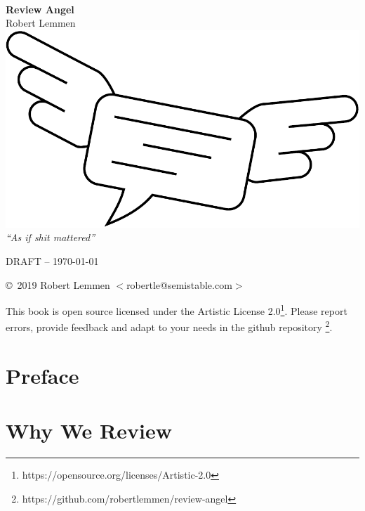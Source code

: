 \documentclass[11pt,twoside]{article}
\begin{document}
\begin{titlepage}
\begin{center}~\\
\vspace{2em}
{\huge\bfseries\sffamily Review Angel}\\
\vspace{1em}
{\large Robert Lemmen}
\vfill\vspace{-2em} %
\includegraphics[width=\textwidth]{logo}
\vfill
\textit{\large ``As if shit mattered''}
\end{center}
\end{titlepage}
\thispagestyle{empty}
\clearpage

DRAFT -- \today

\vspace{1.5em}
\copyright~2019 Robert Lemmen $<$robertle@semistable.com$>$

\vspace{1.5em}
This book is open source licensed under the Artistic License 2.0\footnote{
https://opensource.org/licenses/Artistic-2.0}. Please report errors, provide
feedback and adapt to your needs in the github repository \footnote{
https://github.com/robertlemmen/review-angel}.
\thispagestyle{empty}
\clearpage

\tableofcontents
\clearpage

\section{Preface}
\section{Why We Review}
\lipsum
\lipsum
\lipsum
\lipsum
\end{document}
